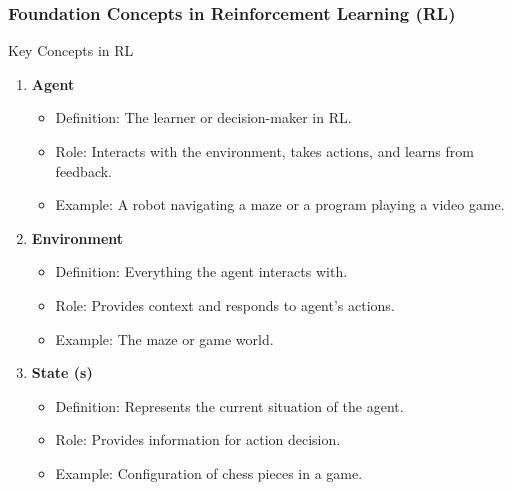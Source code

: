 \documentclass[aspectratio=169]{beamer}
\begin{document}
\begin{frame}[fragile]
    \frametitle{Foundation Concepts in Reinforcement Learning (RL)}
    \begin{block}{Key Concepts in RL}
        \begin{enumerate}
            \item \textbf{Agent}
                \begin{itemize}
                    \item Definition: The learner or decision-maker in RL.
                    \item Role: Interacts with the environment, takes actions, and learns from feedback.
                    \item Example: A robot navigating a maze or a program playing a video game.
                \end{itemize}
                
            \item \textbf{Environment}
                \begin{itemize}
                    \item Definition: Everything the agent interacts with.
                    \item Role: Provides context and responds to agent's actions.
                    \item Example: The maze or game world.
                \end{itemize}
                
            \item \textbf{State (s)}
                \begin{itemize}
                    \item Definition: Represents the current situation of the agent.
                    \item Role: Provides information for action decision.
                    \item Example: Configuration of chess pieces in a game.
                \end{itemize}
        \end{enumerate}
    \end{block}
\end{frame}
\end{document}
